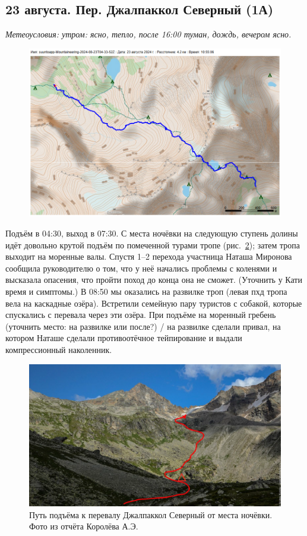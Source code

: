 \subsection{23 августа.  Пер. Джалпаккол Северный (1А)}
\textit{Метеоусловия: утром: ясно, тепло, после 16:00 туман, дождь, вечером ясно.}

\begin{figure}[h!]
	\centering
	\includegraphics[angle=0, width=0.7\linewidth]{../pics/mini_maps/23}
	\label{fig:mini_23}
\end{figure}


Подъём в 04:30, выход в 07:30. С места ночёвки на следующую ступень долины идёт довольно крутой подъём по помеченной турами тропе (рис.~\ref{fig:23augstart}); затем тропа выходит на моренные валы. Спустя 1--2 перехода участница Наташа Миронова сообщила руководителю о том, что у неё начались проблемы с коленями и высказала опасения, что пройти поход до конца она не сможет. \alert{(Уточнить у Кати время и симптомы.)} В 08:50 мы оказались на развилке троп (левая пхд тропа вела на каскадные озёра). Встретили семейную пару туристов с собакой, которые спускались с перевала через эти озёра. При подъёме на моренный гребень \alert{(уточнить место: на развилке или после?)} / на развилке сделали привал, на котором Наташе сделали противоотёчное тейпирование и выдали компрессионный наколенник.

\begin{figure}[h!]
	\centering
	\includegraphics[angle=0, width=0.7\linewidth]{../pics/23augstart}
	\caption{Путь подъёма к перевалу Джалпаккол Северный от места ночёвки. Фото из отчёта Королёва А.Э. \cite{Korolyov2018}}
	\label{fig:23augstart}
\end{figure}

